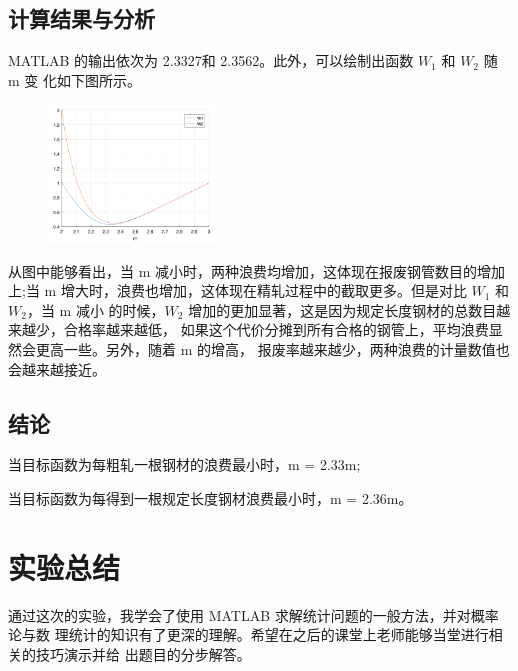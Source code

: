 \documentclass{article}
\begin{document}
\subsection{计算结果与分析}
MATLAB 的输出依次为 2.3327和 2.3562。此外，可以绘制出函数 $W_1$ 和 $W_2$ 随 m 变 化如下图所示。

\begin{figure}[H]
    \centering
    \includegraphics[width=0.4\textwidth]{pic3.png}
\end{figure}

从图中能够看出，当 m 减小时，两种浪费均增加，这体现在报废钢管数目的增加上;当 m 增大时，浪费也增加，这体现在精轧过程中的截取更多。但是对比 $W_1$ 和 $W_2$，当 m 减小 的时候，$W_2$ 增加的更加显著，这是因为规定长度钢材的总数目越来越少，合格率越来越低， 如果这个代价分摊到所有合格的钢管上，平均浪费显然会更高一些。另外，随着 m 的增高， 报废率越来越少，两种浪费的计量数值也会越来越接近。


\subsection{结论}

当目标函数为每粗轧一根钢材的浪费最小时，m = 2.33m;

当目标函数为每得到一根规定长度钢材浪费最小时，m = 2.36m。


\section{实验总结}

通过这次的实验，我学会了使用 MATLAB 求解统计问题的一般方法，并对概率论与数 理统计的知识有了更深的理解。希望在之后的课堂上老师能够当堂进行相关的技巧演示并给 出题目的分步解答。
\end{document}
